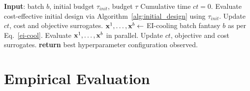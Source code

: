 \documentclass{article}
\begin{document}
\begin{algorithm}[t!]
   \caption{CArBO: Cost Apportioned BO}
   \label{alg:CArBO}
\begin{algorithmic}[1]
   \STATE \textbf{Input}: batch $b$,  initial budget $\tau_{init}$, budget $\tau$
   \STATE Cumulative time $ct = 0$.
   \STATE Evaluate cost-effective initial design via Algorithm~\ref{alg:initial_design} using $\tau_{init}$.
    \STATE Update $ct$, cost and objective surrogates.
        \STATE ${\mathbf x}^1, \dots, {\mathbf x}^b \gets $ EI-cooling batch fantasy $b$ as per Eq.~\ref{ei-cool}.
        \STATE Evaluate ${\mathbf x}^1, \dots, {\mathbf x}^b$ in parallel.
        \STATE Update $ct$, objective and cost surrogates. 
    \ENDWHILE
    \STATE \textbf{return} best hyperparameter configuration observed.
\end{algorithmic}
\end{algorithm}









\section{Empirical Evaluation}\label{experiments}
\end{document}
